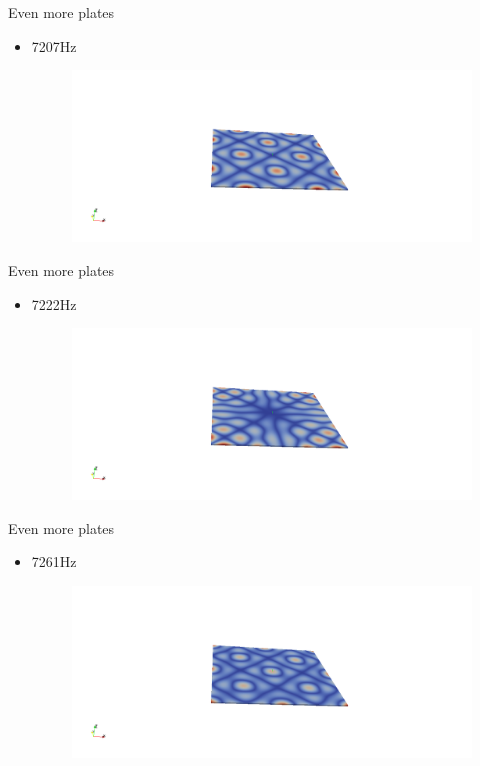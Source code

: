 \documentclass{beamer}[10pt]
\begin{document}
\begin{frame}{Even more plates}
\begin{itemize}
\item{
7207Hz
\begin{figure}
\centering
\includegraphics[scale=0.3, trim= 100mm 0mm 100mm 0mm, clip]{13angle.png}
\end{figure}

}
\end{itemize}
\end{frame}

\begin{frame}{Even more plates}
\begin{itemize}
\item{
7222Hz
\begin{figure}
\centering
\includegraphics[scale=0.3, trim= 100mm 0mm 100mm 0mm, clip]{12a.png}
\end{figure}

}
\end{itemize}
\end{frame}

\begin{frame}{Even more plates}
\begin{itemize}
\item{
7261Hz
\begin{figure}
\centering
\includegraphics[scale=0.3, trim= 100mm 0mm 100mm 0mm, clip]{11a.png}
\end{figure}

}
\end{itemize}
\end{frame}
\end{document}

